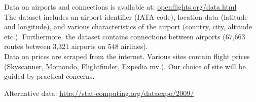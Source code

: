 \label{sec:data}

Data on airports and connections is available at: \href{https://openflights.org/data.html}{openflights.org/data.html} \medskip\\
The dataset includes an airport identifier (IATA code), location data (latitude and longitude), and various characteristics of the airport (country, city, altitude etc.).
Furthermore, the dataset contains connections between airports (67,663 routes between 3,321 airports on 548 airlines). %
\medskip\\
Data on prices are scraped from the internet. Various sites contain flight prices (Skyscanner, Momondo, Flightfinder, Expedia mv.). Our choice of site will be guided by practical concerns.
\par
Alternative data:  \url{http://stat-computing.org/dataexpo/2009/}

